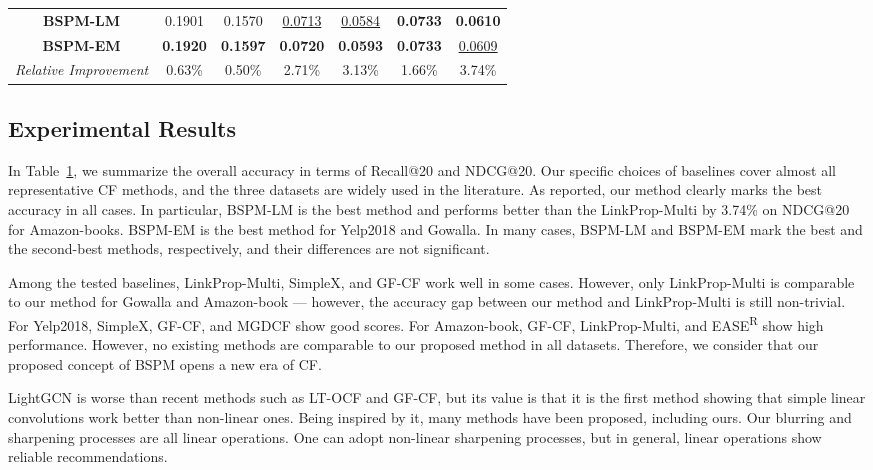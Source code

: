 \documentclass[sigconf,natbib=true]{acmart}
\begin{document}
\begin{table}[ht!]
\begin{tabular}{c cc cc cc}
        \midrule
        \textbf{BSPM-LM}        & 0.1901 & 0.1570          & \underline{0.0713} & \underline{0.0584}  & \textbf{0.0733} & \textbf{0.0610}\\
        \textbf{BSPM-EM}        & \textbf{0.1920} & \textbf{0.1597}
                                                            & \textbf{0.0720} & \textbf{0.0593}  & \textbf{0.0733} & \underline{0.0609}\\
        \midrule
        \textit{Relative Improvement}    
                                & 0.63\% & 0.50\% & 2.71\% & 3.13\% & 1.66\% & 3.74\% \\
        \bottomrule
    \end{tabular}
    \label{tbl:main_exp}
\end{table}


\subsection{Experimental Results}
In Table~\ref{tbl:main_exp}, we summarize the overall accuracy in terms of Recall@20 and NDCG@20. Our specific choices of baselines cover almost all representative CF methods, and the three datasets are widely used in the literature. As reported, our method clearly marks the best accuracy in all cases. In particular, BSPM-LM is the best method and performs better than the LinkProp-Multi by 3.74\% on NDCG@20 for Amazon-books. BSPM-EM is the best method for Yelp2018 and Gowalla. In many cases, BSPM-LM and BSPM-EM mark the best and the second-best methods, respectively, and their differences are not significant. 


Among the tested baselines, LinkProp-Multi, SimpleX, and GF-CF work well in some cases. However, only LinkProp-Multi is comparable to our method for Gowalla and Amazon-book --- however, the accuracy gap between our method and  LinkProp-Multi is still non-trivial. For Yelp2018, SimpleX, GF-CF, and MGDCF show good scores. For Amazon-book, GF-CF, LinkProp-Multi, and EASE\textsuperscript{R} show high performance. However, no existing methods are comparable to our proposed method in all datasets. Therefore, we consider that our proposed concept of BSPM opens a new era of CF.

LightGCN is worse than recent methods such as LT-OCF and GF-CF, but its value is that it is the first method showing that simple linear convolutions work better than non-linear ones. Being inspired by it, many methods have been proposed, including ours. Our blurring and sharpening processes are all linear operations. One can adopt non-linear sharpening processes, but in general, linear operations show reliable recommendations.
\end{document}
